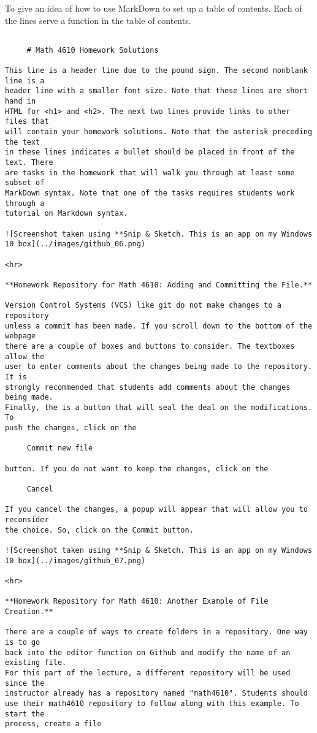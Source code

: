 To give an idea of how to use MarkDown to set up a table of contents. Each of
the lines serve a function in the table of contents.
\begin{verbatim}

     # Math 4610 Homework Solutions

This line is a header line due to the pound sign. The second nonblank line is a
header line with a smaller font size. Note that these lines are short hand in
HTML for <h1> and <h2>. The next two lines provide links to other files that
will contain your homework solutions. Note that the asterisk preceding the text
in these lines indicates a bullet should be placed in front of the text. There
are tasks in the homework that will walk you through at least some subset of
MarkDown syntax. Note that one of the tasks requires students work through a
tutorial on Markdown syntax.

![Screenshot taken using **Snip & Sketch. This is an app on my Windows 10 box](../images/github_06.png)

<hr>

**Homework Repository for Math 4610: Adding and Committing the File.** 

Version Control Systems (VCS) like git do not make changes to a repository 
unless a commit has been made. If you scroll down to the bottom of the webpage
there are a couple of boxes and buttons to consider. The textboxes allow the
user to enter comments about the changes being made to the repository. It is
strongly recommended that students add comments about the changes being made.
Finally, the is a button that will seal the deal on the modifications. To
push the changes, click on the

     Commit new file

button. If you do not want to keep the changes, click on the

     Cancel

If you cancel the changes, a popup will appear that will allow you to reconsider
the choice. So, click on the Commit button.

![Screenshot taken using **Snip & Sketch. This is an app on my Windows 10 box](../images/github_07.png)

<hr>

**Homework Repository for Math 4610: Another Example of File Creation.** 

There are a couple of ways to create folders in a repository. One way is to go
back into the editor function on Github and modify the name of an existing file.
For this part of the lecture, a different repository will be used since the
instructor already has a repository named "math4610". Students should
use their math4610 repository to follow along with this example. To start the
process, create a file


\end{verbatim}
